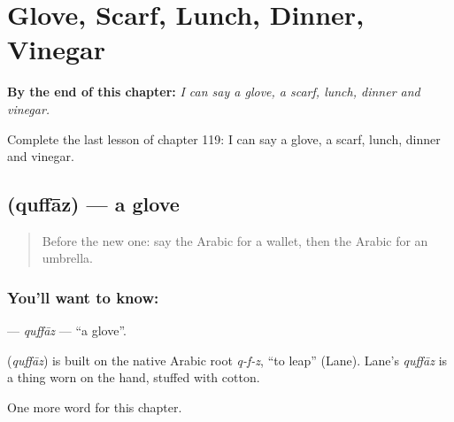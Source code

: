 
\chapter{Glove, Scarf, Lunch, Dinner, Vinegar}
\label{ch:ar-glove-scarf-lunch-dinner-vinegar}

\begin{chapteropening}
\textbf{By the end of this chapter:} \emph{I can say a glove, a scarf, lunch, dinner and vinegar.}

Complete the last lesson of chapter 119: I can say a glove, a scarf, lunch, dinner and vinegar.
\end{chapteropening}

\section[\texorpdfstring{\ar{قفاز} (quffāz)}{قفاز (quffāz)}]{ (quffāz) — a glove}

\label{lesson:AR-C119-quffaz}



\begin{quote}
Before the new one: say the Arabic for a wallet, then the Arabic for an umbrella.
\end{quote}

\subsection*{You'll want to know: }
\textbf{} — \emph{quffāz} — \textquotedblleft{}a glove\textquotedblright{}.

\begin{cousinweb}
\textbf{} (\emph{quffāz}) is built on the native Arabic root \emph{q-f-z}, \textquotedblleft{}to leap\textquotedblright{} (Lane). Lane's \emph{quffāz} is a thing worn on the hand, stuffed with cotton.
\end{cousinweb}

\begin{grammarlens}[title={What you've built}]
One more word for this chapter.
\end{grammarlens}

